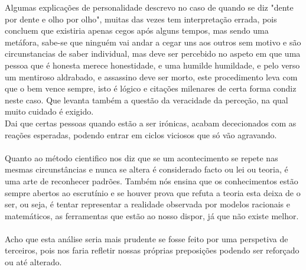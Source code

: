 Algumas explicações de personalidade descrevo no caso de quando se diz "dente por dente e olho por olho", muitas das vezes tem interpretação errada, pois concluem que existiria apenas cegos após alguns tempos, mas sendo uma metáfora, sabe-se que ninguém vai andar a cegar uns aos outros sem motivo e são circunstancias de saber individual, mas deve ser percebido no aspeto em que uma pessoa que é honesta merece honestidade, e uma humilde humildade, e pelo verso um mentiroso aldrabado, e assassino deve ser morto, este procedimento leva com que o bem vence sempre, isto é lógico e citações milenares de certa forma condiz neste caso. Que levanta também a questão da veracidade da perceção, na qual muito cuidado é exigido. \\
Dai que certas pessoas quando estão a ser irónicas, acabam dececionados com as reações esperadas, podendo entrar em ciclos viciosos que só vão agravando.\\
\\
Quanto ao método cientifico nos diz que se um acontecimento se repete nas mesmas circunstâncias e nunca se altera é considerado facto ou lei ou teoria, é uma arte de reconhecer padrões. Também nós ensina que os conhecimentos estão sempre abertos ao escrutínio e se houver prova que refuta a teoria esta deixa de o ser, ou seja, é tentar representar a realidade observada por modelos racionais e matemáticos, as ferramentas que estão ao nosso dispor, já que não existe melhor. \\
\\
Acho que esta análise seria mais prudente se fosse feito por uma perspetiva de terceiros, pois nos faria refletir nossas próprias preposições podendo ser reforçado ou até alterado.
